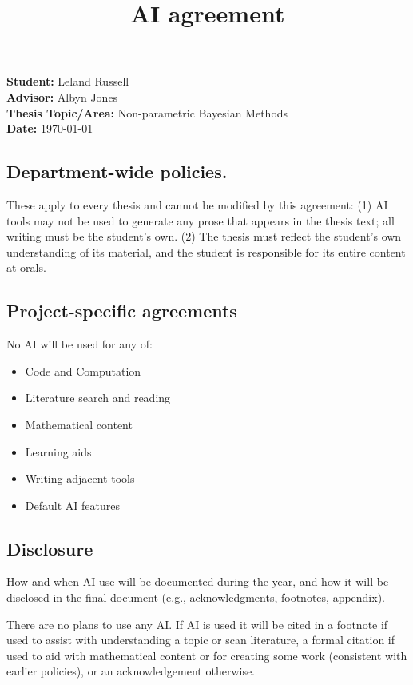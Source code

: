 \documentclass[12pt]{amsart}
\begin{document}
\title{AI agreement}
\maketitle
\noindent \textbf{Student:} Leland Russell \\
\noindent \textbf{Advisor:} Albyn Jones \\

\noindent \textbf{Thesis Topic/Area:} Non-parametric Bayesian Methods \\
\noindent \textbf{Date:} \today 

\subsection*{Department-wide policies.} 
These apply to every thesis and cannot be modified by this agreement: (1) AI tools may not be used to generate any prose that appears in the thesis text; all writing must be the student’s own. (2) The thesis must reflect the student’s own understanding of its material, and the student is responsible for its entire content at orals.

\subsection*{Project-specific agreements}
No AI will be used for any of:
\begin{itemize}
  \item Code and Computation 
  \item Literature search and reading
  \item Mathematical content
  \item Learning aids
  \item Writing-adjacent tools
  \item Default AI features
\end{itemize}

\subsection*{Disclosure} How and when AI use will be documented during the year, and how it will be disclosed in the final document (e.g., acknowledgments, footnotes, appendix). \\
\label{sbsec: disclosure}

There are no plans to use any AI. If AI is used it will be cited in a footnote if used to assist with understanding a topic or scan literature, a formal citation if used to aid with mathematical content or for creating some work (consistent with earlier policies), or an acknowledgement otherwise.
\end{document}
